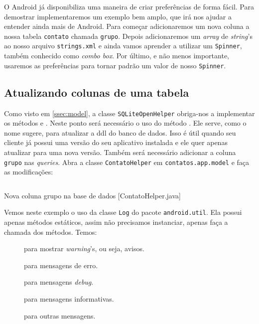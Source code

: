 O Android já disponibiliza uma maneira de criar preferências de forma fácil. Para demostrar implementaremos
um exemplo bem amplo, que irá nos ajudar a entender ainda mais de Android. Para começar adicionaremos
um nova coluna a nossa tabela \texttt{contato} chamada \texttt{grupo}. Depois adicionaremos um \textit{array}
de \textit{string}'s ao nosso arquivo \texttt{strings.xml} e ainda vamos aprender a utilizar um
\texttt{Spinner}, também conhecido como \textit{combo box}. Por último, e não menos importante, usaremos
as preferências para tornar padrão um valor de nosso \texttt{Spinner}.


\subsection{Atualizando colunas de uma tabela}

Como visto em \ref{ssec:model}, a classe \texttt{SQLiteOpenHelper} obriga-nos a implementar os métodos
 e . Neste ponto será necessário o uso do método .
Ele serve, como o nome sugere, para atualizar a \gls{ddl} do banco de dados. Isso é útil quando seu cliente
já possui uma versão do seu aplicativo instalada e ele quer apenas atualizar para uma nova versão. Também será
necessário adicionar a coluna \texttt{grupo} nas \textit{queries}. Abra a classe \texttt{ContatoHelper} em
\texttt{contatos.app.model} e faça as modificações:

\begin{listing}[H]
  \inputminted[linenos=true,frame=bottomline,tabsize=3]{ java }{ source/ContatoHelper-6.java }
  \caption{Nova coluna grupo na base de dados [ContatoHelper.java]}
\end{listing}

Vemos neste exemplo o uso da classe \texttt{Log} do pacote \texttt{android.util}. Ela possui apenas
métodos estáticos, assim não precisamos instanciar, apenas faça a chamada dos métodos. Temos:
\begin{description}
\item[] para mostrar \textit{warning}'s, ou seja, avisos.
\item[] para mensagens de erro.
\item[] para mensagens \textit{\gls{debug}}.
\item[] para mensagens informativas.
\item[] para outras mensagens.
\end{description}

